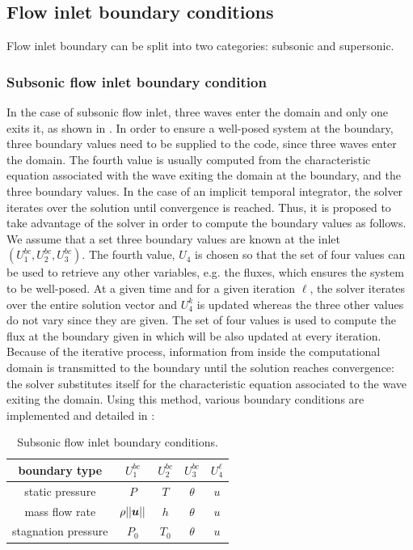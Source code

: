 \subsection{Flow inlet boundary conditions} \label{sec:flow-inlet-bc}
Flow inlet boundary can be split into two categories: subsonic and supersonic.
\subsubsection{Subsonic flow inlet boundary condition} \label{sec:sub-flow-inlet-bc}
In the case of subsonic flow inlet, three waves enter the domain and only one exits it, as shown in . In order to ensure a well-posed system at the boundary, three boundary values need to be supplied to the code, since three waves enter the domain. The fourth value is usually computed from the characteristic equation associated with the wave exiting the domain at the boundary, and the three boundary values. In the case of an implicit temporal integrator, the solver iterates over the solution until convergence is reached. Thus, it is proposed to take advantage of the solver in order to compute the boundary values as follows. We assume that a set three boundary values are known at the inlet $\left(U_1^{bc}, U_2^{bc}, U_3^{bc}\right)$. The fourth value, $U_4$ is chosen so that the set of four values can be used to retrieve any other variables, e.g. the fluxes, which ensures the system to be well-posed. At a given time and for a given iteration $\ell$, the solver iterates over the entire solution vector and $U_4^k$ is updated whereas the three other values do not vary since they are given. The set of four values is used to compute the flux at the boundary given in  which will be also updated at every iteration. Because of the iterative process, information from inside the computational domain is transmitted to the boundary until the solution reaches convergence: the solver substitutes itself for the characteristic equation associated to the wave exiting the domain. Using this method, various boundary conditions are implemented and detailed in :
%
\begin{table}[H]
\begin{center}
\caption{ Subsonic flow inlet boundary conditions.}
\label{tbl:sub-inlet-flow-bc}
\begin{tabular}{|c|c|c|c|c|}
 \hline
boundary type & $U_1^{bc}$  & $U_2^{bc}$ & $U_3^{bc}$ & $U_4^{\ell}$ \\  \hline
static pressure & $P$     & $T$    & $\theta$  & $u$     \\  \hline
mass flow rate  & $\rho|| \boldsymbol u||$     & $h$  & $\theta$  & $u$     \\  \hline
stagnation pressure & $P_0$  & $T_0$    & $\theta$  & $u$     \\  \hline
\end{tabular}
\end{center}
\end{table}
